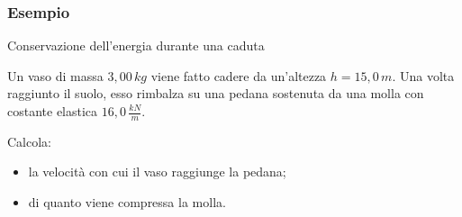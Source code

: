 \documentclass[]{beamer}
\theoremstyle{plain}
\begin{document}
\begin{frame}
  \frametitle{Esempio}
  \begin{exampleblock}{Conservazione dell'energia durante una caduta}
{\small Un vaso di massa $ 3,00 \, kg $ viene fatto cadere da un'altezza $h = 15,0 \, m $. Una volta raggiunto il suolo, esso rimbalza su una pedana sostenuta da una molla con costante elastica $ 16,0 \, \frac{kN}{m} $.

Calcola:
\begin{itemize}
  \item la velocità con cui il vaso raggiunge la pedana;
  \item di quanto viene compressa la molla.
\end{itemize}}
\end{exampleblock}
\end{frame}
\end{document}
